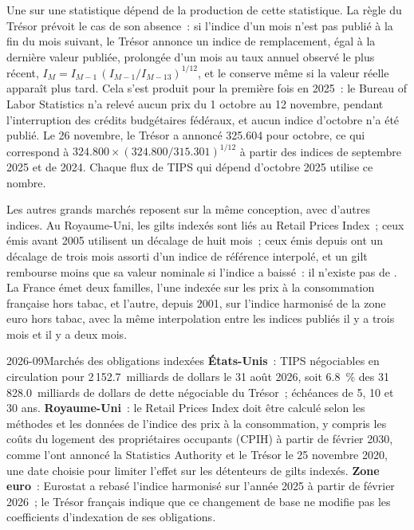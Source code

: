 \begin{remark}\label{rem:m2:inflation-markets:contingency}
Une  sur une statistique dépend de la production de cette statistique. La
règle du Trésor prévoit le cas de son absence~: si l'indice d'un mois n'est pas publié à
la fin du mois suivant, le Trésor annonce un indice de remplacement, égal à la dernière valeur publiée,
prolongée d'un mois au taux annuel observé le plus récent,
$I_M = I_{M-1}\,(I_{M-1}/I_{M-13})^{1/12}$, et le conserve même si la valeur
réelle apparaît plus tard. Cela s'est produit pour la première fois en 2025~: le Bureau of
Labor Statistics n'a relevé aucun prix du 1 octobre au 12 novembre, pendant
l'interruption des crédits budgétaires fédéraux, et aucun indice d'octobre n'a été publié. Le 26
novembre, le Trésor a annoncé 325.604 pour octobre, ce qui correspond à
$324.800 \times (324.800/315.301)^{1/12}$ à partir des indices de septembre 2025
et de 2024. Chaque flux de TIPS qui dépend d'octobre 2025 utilise ce nombre.
\end{remark}

Les autres grands marchés reposent sur la même conception, avec d'autres indices. Au
Royaume-Uni, les gilts indexés sont liés au Retail Prices Index~; ceux émis avant 2005
utilisent un décalage de huit mois~; ceux émis depuis ont un décalage de trois mois
assorti d'un indice de référence interpolé, et un gilt rembourse moins que sa valeur nominale
si l'indice a baissé~: il n'existe pas de .
La France émet deux familles, l'une indexée sur les prix à la consommation française hors
tabac, et l'autre, depuis 2001, sur l'indice harmonisé de la zone euro hors tabac, avec la
même interpolation entre les indices publiés il y a trois mois
et il y a deux mois.

\begin{dated}{2026-09}{Marchés des obligations indexées}\label{dat:m2:inflation-markets:markets}
\textbf{États-Unis}~: TIPS négociables en circulation pour 2\,152.7~milliards de dollars le 31
août 2026, soit 6.8~\% des 31\,828.0~milliards de dollars de dette négociable du Trésor~; échéances
de 5, 10 et 30 ans. \textbf{Royaume-Uni}~: le Retail Prices Index doit être calculé selon les
méthodes et les données de l'indice des prix à la consommation, y compris les coûts du logement
des propriétaires occupants (CPIH) à partir de février 2030, comme l'ont annoncé la
Statistics Authority et le Trésor le 25 novembre 2020, une date choisie pour
limiter l'effet sur les détenteurs de gilts indexés. \textbf{Zone euro}~:
Eurostat a rebasé l'indice harmonisé sur l'année 2025 à partir de février 2026~; le Trésor
français indique que ce changement de base ne modifie pas les coefficients d'indexation de ses obligations.
\end{dated}

